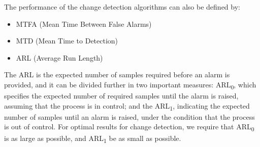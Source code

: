 The performance of the change detection algorithms can also be defined by:

\begin{itemize}
    \item MTFA (Mean Time Between False Alarms) 
    \item MTD (Mean Time to Detection)
    \item ARL (Average Run Length)
\end{itemize}


\par The ARL is the expected number of samples required before an alarm is provided, and it can be divided further in two important measures: ARL\textsubscript{0},
which specifies the expected number of required samples until the alarm is raised, assuming that the process is in control; and the ARL\textsubscript{1}, indicating
the expected number of samples until an alarm is raised, under the condition that the process is out of control. For optimal results for change detection, we require
that ARL\textsubscript{0} is as large as possible, and ARL\textsubscript{1} be as small as possible.
